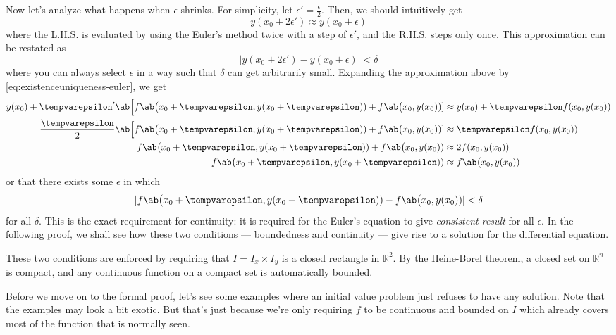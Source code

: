 Now let's analyze what happens when \(\epsilon\) shrinks. For simplicity, let
\(\epsilon' = \frac{\epsilon}{2}\). Then, we should intuitively get
\begin{equation}
  y(x_0 + 2\epsilon') \approx y(x_0 + \epsilon)
\end{equation}
where the L.H.S. is evaluated by using the Euler's method twice with a step of
\(\epsilon'\), and the R.H.S. steps only once. This approximation can be restated as
\begin{equation}
  |y(x_0 + 2\epsilon') - y(x_0 + \epsilon)| < \delta
\end{equation}
where you can always select \(\epsilon\) in a way such that \(\delta\) can get arbitrarily
small. Expanding the approximation above by \cref{eq:existenceuniqueness-euler}, we get
\begin{align}
  y(x_0) + \epsilon'\ab\Big[f\ab\big(x_0 + \epsilon, y(x_0 + \epsilon)) + f\ab\big(x_0, y(x_0))] & \approx y(x_0) + \epsilon f(x_0, y(x_0)) \nonumber \\
  \frac{\epsilon}{2}\ab\Big[f\ab\big(x_0 + \epsilon, y(x_0 + \epsilon)) + f\ab\big(x_0, y(x_0))] & \approx \epsilon f(x_0, y(x_0))                    \\
  f\ab\big(x_0 + \epsilon, y(x_0 + \epsilon)) + f\ab\big(x_0, y(x_0))                            & \approx 2 f(x_0, y(x_0))                           \\
  f\ab\big(x_0 + \epsilon, y(x_0 + \epsilon))                                                    & \approx f\ab\big(x_0, y(x_0))
\end{align}
or that there exists some \(\epsilon\) in which
\begin{equation}
  |f\ab\big(x_0 + \epsilon, y(x_0 + \epsilon)) - f\ab\big(x_0, y(x_0))| < \delta
\end{equation}
for all \(\delta\). This is the exact requirement for continuity: it is required for
the Euler's equation to give \emph{consistent result} for all \(\epsilon\). In the
following proof, we shall see how these two conditions --- boundedness and continuity
--- give rise to a solution for the differential equation.

These two conditions are enforced by requiring that \(I = I_x \times I_y\) is a closed
rectangle in \(\mathbb{R}^2\). By the Heine-Borel theorem, a closed set on \(\mathbb{R}^n\)
is compact, and any continuous function on a compact set is automatically bounded.

Before we move on to the formal proof, let's see some examples where an initial value
problem just refuses to have any solution. Note that the examples may look a bit exotic.
But that's just because we're only requiring \(f\) to be continuous and bounded on
\(I\) which already covers most of the function that is normally seen.

